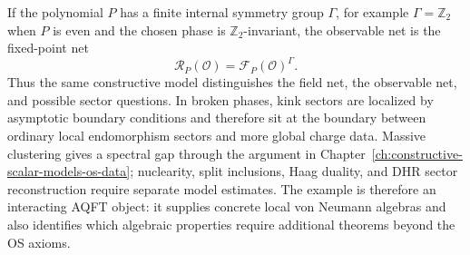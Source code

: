 If the polynomial \(P\) has a finite internal symmetry group \(\Gamma\), for
example \(\Gamma=\mathbb Z_2\) when \(P\) is even and the chosen phase is
\(\mathbb Z_2\)-invariant, the observable net is the fixed-point net
\begin{equation}
  \mathcal R_P(\mathcal O)
  =
  \mathcal F_P(\mathcal O)^\Gamma .
  \label{eq:p-phi-two-constructive-observable-net}
\end{equation}
Thus the same constructive model distinguishes the field net, the observable
net, and possible sector questions.  In broken phases, kink sectors are
localized by asymptotic boundary conditions and therefore sit at the boundary
between ordinary local endomorphism sectors and more global charge data.
Massive
clustering gives a spectral gap through the argument in
Chapter~\ref{ch:constructive-scalar-models-os-data}; nuclearity, split
inclusions, Haag duality, and DHR sector reconstruction require separate
model estimates.  The example is therefore an interacting AQFT object: it
supplies concrete local von Neumann algebras and also identifies which
algebraic properties require additional theorems beyond the OS axioms.

